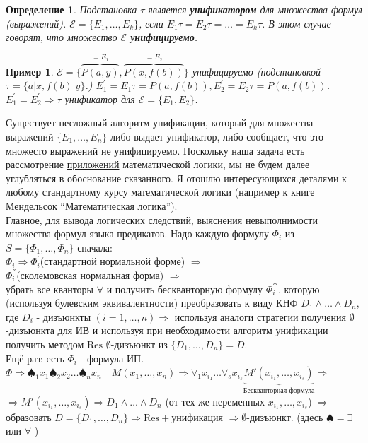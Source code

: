 \documentclass{article}
\newtheorem{example}{Пример}
\newtheorem{definition}{Определение}
\numberwithin{example}{section}
\numberwithin{question}{section}
\numberwithin{Remark}{section}
\numberwithin{theorem}{section}
\numberwithin{definition}{section}
\numberwithin{proposition}{section}
\begin{document}
\begin{definition}
	Подстановка $\tau$ является \textbf{унификатором} для множества формул (выражений). $\mathcal{E}=\{E_1,\ldots,E_k \}$, если $E_1\tau =E_2\tau=\ldots=E_k\tau$. В этом случае говорят, что множество $\mathcal{E}$ \textbf{унифицируемо}.
\end{definition}
\begin{example}
	$\mathcal{E}=\{\overbrace{P(a,y)}^{=E_1},\overbrace{P(x,f(b))}^{=E_2} \}$ унифицируемо (подстановкой $\tau=\{a|x,f(b)|y \}$.) $E_1^{'}=E_1\tau=P(a,f(b)),E_2^{'}=E_2\tau=P(a,f(b))$. $E_1^{'}=E_2^{'}\Rightarrow\tau$ унификатор для $\mathcal{E}=\{E_1,E_2 \}$.
\end{example}
Существует несложный алгоритм унификации, который для множества выражений $\{E_1,\ldots,E_n \}$ либо выдает унификатор, либо сообщает, что это множесто выражений не унифицируемо. Поскольку наша задача есть рассмотрение \underline{приложений} математической логики, мы не будем далее углубляться в обоснование сказанного. Я отошлю интересующихся деталями к любому стандартному курсу математической логики (например к книге Мендельсок ``Математическая логика'').\\
\underline{Главное}, для вывода логических следствий, выяснения невыполнимости множества формул языка предикатов. Надо каждую формулу $\Phi_i$ из $S=\{ \Phi_1,\ldots,\Phi_n\}$ сначала:\\
$\Phi_i\Rightarrow \Phi_i^{'}$(стандартной нормальной форме) $\Rightarrow$\\
$\Phi_i^{''}$(сколемовская нормальная форма) $\Rightarrow$
\\
убрать все кванторы $\forall$ и получить бескванторную формулу $\Phi^{'''}_i$, которую (используя булевским эквивалентности) преобразовать к виду КНФ $D_1\wedge \ldots\wedge D_n$, где $D_i$ - дизъюнкты $(i=1,\ldots, n)\Rightarrow$ используя аналоги стратегии получения $\emptyset$-дизъюнкта для ИВ и используя при необходимости алгоритм унификации получить методом $\mathrm{Res}$ $\emptyset$-дизъюнкт из $\{D_1,\ldots,D_n \}=D$.\\
Ещё раз: есть $\Phi_i$ - формула ИП. $\Phi\Rightarrow \spadesuit _1x_1\spadesuit_2x_2\ldots\spadesuit_nx_n\quad M(x_1,\ldots,x_n)\Rightarrow \forall_1 x_{i_1}\ldots\forall_sx_{i_s}\underbrace{M'(x_{i_1},\ldots,x_{i_s})}_{\text{Бескванторная формула}}\Rightarrow$\\
$\Rightarrow M'(x_{i_1},\ldots,x_{i_s})\Rightarrow D_1\wedge \ldots\wedge D_n$ (от тех же переменных $x_{i_1},\ldots,x_{i_s}$) $\Rightarrow$ образовать $D=\{D_1,\ldots,D_n \}\Rightarrow\mathrm{Res}+$унификация $\Rightarrow\emptyset$-дизъюнкт. (здесь $\spadesuit=\exists$ или $\forall$ )\\
\end{document}
